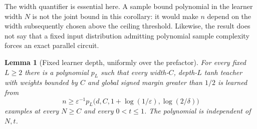 \documentclass[11pt]{article}
\newtheorem{lemma}[theorem]{Lemma}
\theoremstyle{remark}
\begin{document}
The width quantifier is essential here. A sample bound polynomial in
the learner width $N$ is not the joint bound in this corollary: it
would make $n$ depend on the width subsequently chosen above the
ceiling threshold. Likewise, the result does not say that a fixed
input distribution admitting polynomial sample complexity forces an
exact parallel circuit.

\begin{lemma}[Fixed learner depth, uniformly over the prefactor]
\label{lem:fixed-depth-uniform}
For every fixed $L\ge2$ there is a polynomial $p_L$ such that
every width-$C$, depth-$L$ tanh teacher with weights bounded
by $C$ and global signed margin greater than $1/2$ is learned
from
\[
 n\ge \varepsilon^{-1}
 p_L\bigl(d,C,1+\log(1/\varepsilon),\log(2/\delta)\bigr)
\]
examples at every $N\ge C$ and every $0<t\le1$.
The polynomial is independent of $N,t$.
\end{lemma}
\end{document}
